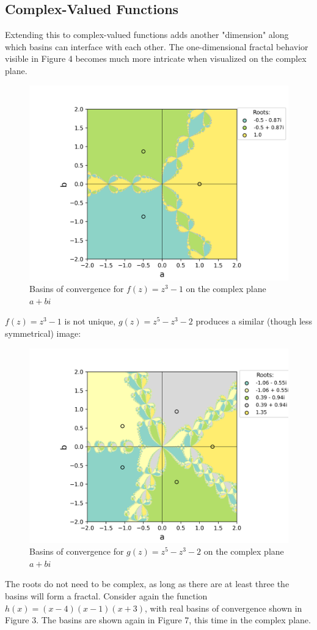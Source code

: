 \documentclass[10pt,a4paper]{article}
\begin{document}
		\subsection{Complex-Valued Functions}
		Extending this to complex-valued functions adds another "dimension" along which basins can interface with each other. The one-dimensional fractal behavior visible in Figure 4 becomes much more intricate when visualized on the complex plane. 
		\begin{figure}[H]
			\centering
			\caption{Basins of convergence for $f(z) = z^3 - 1$ on the complex plane $a+bi$}
			\includegraphics[scale=0.5]{figure5}
		\end{figure}
		$f(z)=z^3-1$ is not unique, $g(z)=z^5 - z^3 -2$ produces a similar (though less symmetrical) image:
		\begin{figure}[H]
			\centering
			\caption{Basins of convergence for $g(z) =z^5 - z^3 -2$ on the complex plane $a+bi$}
			\includegraphics[scale=0.5]{figure6}
		\end{figure}
		The roots do not need to be complex, as long as there are at least three the basins will form a fractal. Consider again the function $h(x) =  (x - 4)(x - 1)(x + 3)$, with real basins of convergence shown in Figure 3. The basins are shown again in Figure 7, this time in the complex plane.
		
\end{document}
